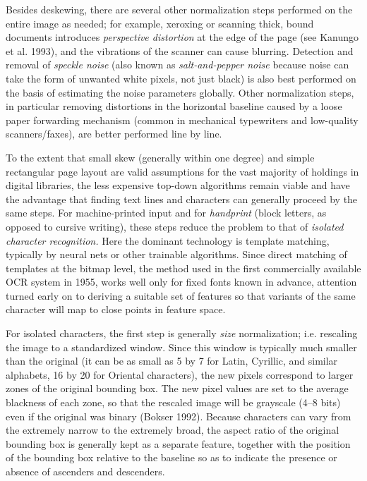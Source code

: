 Besides deskewing, there are several other normalization steps performed on
the entire image as needed; for example, xeroxing or scanning thick, bound
documents introduces {\it perspective distortion} at the edge of the page (see
Kanungo et al. 1993),\nocite{Kanungo:1993} and the vibrations of the scanner
can cause blurring. Detection and removal of {\it speckle noise} (also known
as {\it salt-and-pepper noise} because noise can take the form of unwanted
white pixels, not just black) is also best performed on the basis of estimating
the noise parameters globally.  Other normalization steps, in particular
removing distortions in the horizontal baseline caused by a loose paper
forwarding mechanism (common in mechanical typewriters and low-quality
scanners/faxes), are better performed line by line. 

To the extent that small skew (generally within one degree) and simple
rectangular page layout are valid assumptions for the vast majority of
holdings in digital libraries, the less expensive top-down algorithms remain
viable and have the advantage that finding text lines and characters can
generally proceed by the same steps. For machine-printed input and for {\it
  handprint} (block letters, as opposed to cursive writing),
these steps reduce the problem to that of {\it isolated character
  recognition.} Here the dominant technology is template matching, typically
by neural nets or other trainable algorithms. Since direct matching of
templates at the bitmap level, the method used in the first commercially
available OCR system in 1955, works well only for fixed fonts known in
advance, attention turned early on to deriving a suitable set of features so
that variants of the same character will map to close points in feature space.

For isolated characters, the first step is generally {\it
  size} normalization; i.e. rescaling the image to a
standardized window.  Since this window is typically much smaller than the
original (it can be as small as 5 by 7 for Latin, Cyrillic, and similar
alphabets, 16 by 20 for Oriental characters), the new pixels correspond to
larger zones of the original bounding box. The new pixel values are set to the
average blackness of each zone, so that the rescaled image will be grayscale
(4--8 bits) even if the original was binary (Bokser 1992).\nocite{Bokser:1992}
Because characters can vary from the extremely narrow to the extremely broad,
the aspect ratio of the original bounding box is generally kept as a separate
feature, together with the position of the bounding box relative to the
baseline so as to indicate the presence or absence of ascenders and
descenders.

